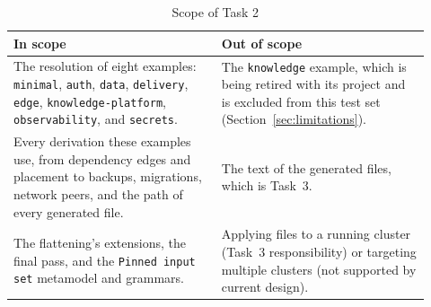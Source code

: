 \begin{table}[!htbp]
\centering
\begin{tabular}{>{\raggedright\arraybackslash}p{0.46\linewidth}>{\raggedright\arraybackslash}p{0.46\linewidth}}
\hline
\textbf{In scope} & \textbf{Out of scope} \\
\hline
The resolution of eight examples: \texttt{minimal}, \texttt{auth},
  \texttt{data}, \texttt{delivery}, \texttt{edge},
  \texttt{knowledge-platform}, \texttt{observability}, and \texttt{secrets}. &
  The \texttt{knowledge} example, which is being retired with its
  project and is excluded from this test set (Section~\ref{sec:limitations}). \\
Every derivation these examples use, from dependency edges and placement to
  backups, migrations, network peers, and the path of every generated file. &
  The text of the generated files, which is Task~3. \\
The flattening's extensions, the final pass, and the \texttt{Pinned input set} metamodel
  and grammars. &
  Applying files to a running cluster (Task~3 responsibility) or targeting multiple clusters (not supported by current design). \\
\hline
\end{tabular}
\caption{Scope of Task 2}
\label{tab:scope}
\end{table}
